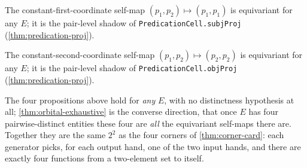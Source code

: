 \begin{proposition}\label{prop:orbital-subjproj-equivariant}\leanok{}
The constant-first-coordinate self-map \((p_1,p_2)\mapsto(p_1,p_1)\) is
equivariant for any \(E\); it is the pair-level shadow of
\texttt{PredicationCell.subjProj} (\cref{thm:predication-proj}).
\end{proposition}

\begin{proposition}\label{prop:orbital-objproj-equivariant}\leanok{}
The constant-second-coordinate self-map \((p_1,p_2)\mapsto(p_2,p_2)\) is
equivariant for any \(E\); it is the pair-level shadow of
\texttt{PredicationCell.objProj} (\cref{thm:predication-proj}).
\end{proposition}

The four propositions above hold for \emph{any} \(E\), with no distinctness
hypothesis at all; \cref{thm:orbital-exhaustive} is the converse direction,
that once \(E\) has four pairwise-distinct entities these four are
\emph{all} the equivariant self-maps there are. Together they are the same
\(2^2\) as the four corners of \cref{thm:corner-card}: each generator picks,
for each output hand, one of the two input hands, and there are exactly four
functions from a two-element set to itself.
